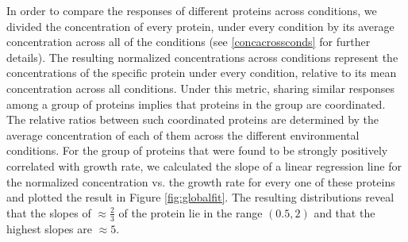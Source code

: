 In order to compare the responses of different proteins across conditions, we divided the concentration of every protein, under every condition by its average concentration across all of the conditions (see \ref{concacrossconds} for further details).
The resulting normalized concentrations across conditions represent the concentrations of the specific protein under every condition, relative to its mean concentration across all conditions.
Under this metric, sharing similar responses among a group of proteins implies that proteins in the group are coordinated.
The relative ratios between such coordinated proteins are determined by the average concentration of each of them across the different environmental conditions.
For the group of proteins that were found to be strongly positively correlated with growth rate, we calculated the slope of a linear regression line for the normalized concentration vs. the growth rate for every one of these proteins and plotted the result in Figure \ref{fig:globalfit}.
The resulting distributions reveal that the slopes of $\approx \frac{2}{3}$ of the protein lie in the range $(0.5,2)$ and that the highest slopes are $\approx 5$.